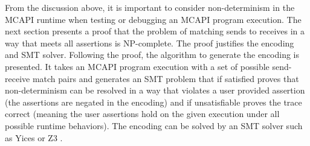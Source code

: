 From the discussion above, it is important to consider non-determinism
in the MCAPI runtime when testing or debugging an MCAPI program
execution.  The next section presents a proof that the problem of
matching sends to receives in a way that meets all assertions is
NP-complete. The proof justifies the encoding and SMT solver.
Following the proof, the algorithm to generate the encoding is
presented. It takes an MCAPI program execution with a set of possible
send-receive match pairs and generates an SMT problem that if
satisfied proves that non-determinism can be resolved in a way that
violates a user provided assertion (the assertions are negated in the
encoding) and if unsatisfiable proves the trace correct (meaning the
user assertions hold on the given execution under all possible runtime
behaviors). The encoding can be solved by an SMT solver such as Yices
\cite{dutertre:CAV06} or Z3 \cite{demoura:tacas08}.



